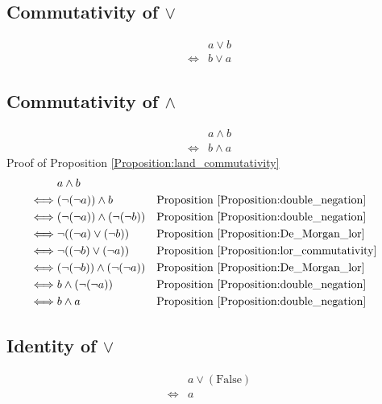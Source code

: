 \subsection{Commutativity of $\lor$}
\begin{prop}
\label{Proposition:lor_commutativity}
\begin{align*}
& a \lor b \\
\iff & b \lor a
\end{align*}
\end{prop}

\subsection{Commutativity of $\land$}
\begin{prop}
\label{Proposition:land_commutativity}
\begin{align*}
& a \land b \\
\iff & b \land a
\end{align*}
Proof of Proposition \ref{Proposition:land_commutativity}
\begin{align*}
& a \land b \\
\iff & (\lnot (\lnot a)) \land b
& & \text{Proposition \ref{Proposition:double_negation}} \\
\iff & (\lnot (\lnot a)) \land (\lnot (\lnot b))
& & \text{Proposition \ref{Proposition:double_negation}} \\
\iff & \lnot ((\lnot a) \lor (\lnot b))
& & \text{Proposition \ref{Proposition:De_Morgan_lor}} \\
\iff & \lnot ((\lnot b) \lor (\lnot a))
& & \text{Proposition \ref{Proposition:lor_commutativity}} \\
\iff & (\lnot (\lnot b)) \land (\lnot (\lnot a))
& & \text{Proposition \ref{Proposition:De_Morgan_lor}} \\
\iff & b \land (\lnot (\lnot a))
& & \text{Proposition \ref{Proposition:double_negation}} \\
\iff & b \land a
& & \text{Proposition \ref{Proposition:double_negation}} \\
\end{align*}
\end{prop}

\subsection{Identity of $\lor$}
\begin{prop}
\label{Proposition:lor_identity_1}
\begin{align*}
& a \lor (\text{False}) \\
\iff & a
\end{align*}
\end{prop}

